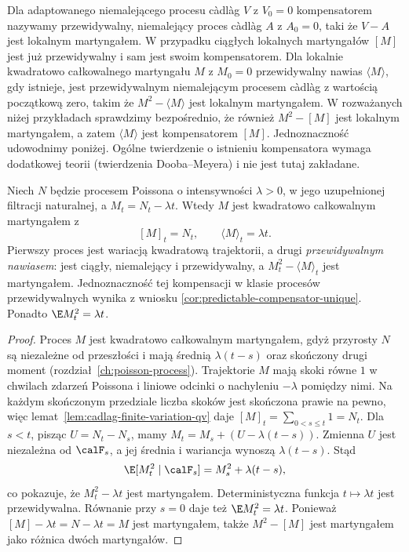 \begin{definicja}
\label{def:jump-predictable-bracket}
Dla adaptowanego niemalejącego procesu c\`adl\`ag
$V$ z $V_0=0$ kompensatorem nazywamy przewidywalny,
niemalejący proces c\`adl\`ag $A$ z $A_0=0$,
taki że $V-A$ jest lokalnym martyngałem.
W przypadku ciągłych lokalnych martyngałów
$[M]$ jest już przewidywalny i sam jest swoim
kompensatorem. Dla lokalnie kwadratowo
całkowalnego martyngału $M$ z $M_0=0$
przewidywalny nawias $\langle M\rangle$,
gdy istnieje, jest przewidywalnym niemalejącym
procesem c\`adl\`ag z wartością początkową zero, takim że
$M^2-\langle M\rangle$ jest lokalnym martyngałem.
W rozważanych niżej przykładach sprawdzimy
bezpośrednio, że również $M^2-[M]$ jest
lokalnym martyngałem, a zatem $\langle M\rangle$
jest kompensatorem $[M]$.
Jednoznaczność udowodnimy poniżej. Ogólne
twierdzenie o istnieniu kompensatora wymaga
dodatkowej teorii (twierdzenia Dooba--Meyera)
i nie jest tutaj zakładane.
\end{definicja}

\begin{twierdzenie}
\label{thm:poisson-brackets}
Niech $N$ będzie procesem Poissona o intensywności
$\lambda>0$, w jego uzupełnionej filtracji naturalnej,
a $M_t=N_t-\lambda t$. Wtedy $M$ jest kwadratowo
całkowalnym martyngałem z
\[
[M]_t=N_t,\qquad \langle M\rangle_t=\lambda t.
\]
Pierwszy proces jest wariacją kwadratową trajektorii,
a drugi \emph{przewidywalnym nawiasem}: jest ciągły,
niemalejący i przewidywalny, a $M_t^2-\langle M\rangle_t$
jest martyngałem. Jednoznaczność tej kompensacji w klasie procesów
przewidywalnych wynika z wniosku
\ref{cor:predictable-compensator-unique}.
Ponadto $\E M_t^2=\lambda t$.
\end{twierdzenie}
\begin{proof}
Proces $M$ jest kwadratowo całkowalnym martyngałem,
gdyż przyrosty $N$ są niezależne od przeszłości
i mają średnią $\lambda(t-s)$ oraz skończony
drugi moment (rozdział~\ref{ch:poisson-process}).
Trajektorie $M$ mają skoki równe $1$ w chwilach
zdarzeń Poissona i liniowe odcinki o nachyleniu
$-\lambda$ pomiędzy nimi. Na każdym skończonym
przedziale liczba skoków jest skończona prawie na pewno,
więc lemat~\ref{lem:cadlag-finite-variation-qv} daje
$[M]_t=\sum_{0<s\le t}1=N_t$.
Dla $s<t$, pisząc $U=N_t-N_s$, mamy
$M_t=M_s+(U-\lambda(t-s))$.
Zmienna $U$ jest niezależna od $\calF_s$, a jej
średnia i wariancja wynoszą $\lambda(t-s)$.
Stąd
\[
\E[M_t^2\mid\calF_s]
=M_s^2+\lambda(t-s),
\]
co pokazuje, że $M_t^2-\lambda t$ jest martyngałem.
Deterministyczna funkcja $t\mapsto\lambda t$ jest
przewidywalna. Równanie przy $s=0$ daje też
$\E M_t^2=\lambda t$.
Ponieważ $[M]-\lambda t=N-\lambda t=M$
jest martyngałem, także $M^2-[M]$
jest martyngałem jako różnica dwóch martyngałów.
\end{proof}


